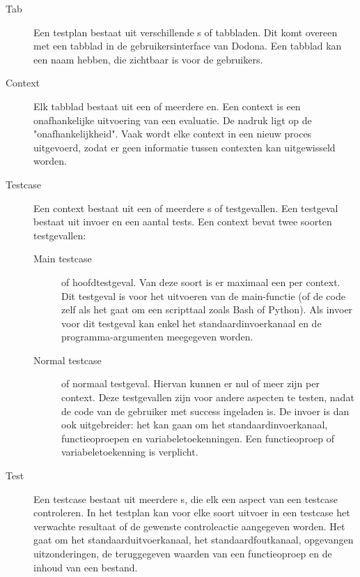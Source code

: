\begin{description}
    \item[Tab] Een testplan bestaat uit verschillende s of tabbladen.
               Dit komt overeen met een tabblad in de gebruikersinterface van Dodona.
               Een tabblad kan een naam hebben, die zichtbaar is voor de gebruikers.
    \item[Context] Elk tabblad bestaat uit een of meerdere en.
                   Een context is een onafhankelijke uitvoering van een evaluatie.
                   De nadruk ligt op de "onafhankelijkheid".
                   Vaak wordt elke context in een nieuw proces uitgevoerd, zodat er geen informatie tussen contexten kan uitgewisseld worden.
    \item[Testcase] Een context bestaat uit een of meerdere s of testgevallen.
                    Een testgeval bestaat uit invoer en een aantal tests.
                    Een context bevat twee soorten testgevallen:
                    \begin{description}
                        \item[Main testcase] of hoofdtestgeval.
                        Van deze soort is er maximaal een per context.
                        Dit testgeval is voor het uitvoeren van de main-functie (of de code zelf als het gaat om een scripttaal zoals Bash of Python).
                        Als invoer voor dit testgeval kan enkel het standaardinvoerkanaal en de programma-argumenten meegegeven worden.
                        \item[Normal testcase] of normaal testgeval.
                        Hiervan kunnen er nul of meer zijn per context.
                        Deze testgevallen zijn voor andere aspecten te testen, nadat de code van de gebruiker met success ingeladen is.
                        De invoer is dan ook uitgebreider: het kan gaan om het standaardinvoerkanaal, functieoproepen en variabeletoekenningen.
                        Een functieoproep of variabeletoekenning is verplicht.
                    \end{description}
    \item[Test] Een testcase bestaat uit meerdere s, die elk een aspect van een testcase controleren.
                In het testplan kan voor elke soort uitvoer in een testcase het verwachte resultaat of de gewenste controleactie aangegeven worden.
                Het gaat om het standaarduitvoerkanaal, het standaardfoutkanaal, opgevangen uitzonderingen, de teruggegeven waarden van een functieoproep en de inhoud van een bestand.
\end{description}

